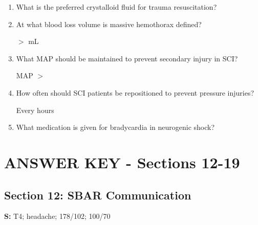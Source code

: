 \documentclass[11pt]{article}
\begin{document}
\begin{enumerate}
    \underline{\hspace{3cm}} gauge or larger, quantity: \underline{\hspace{2cm}}
    
    \vspace{0.3cm}
    
    \item What is the preferred crystalloid fluid for trauma resuscitation?
    
    \underline{\hspace{6cm}}
    
    \vspace{0.3cm}
    
    \item At what blood loss volume is massive hemothorax defined?
    
    $>$ \underline{\hspace{3cm}} mL
    
    \vspace{0.3cm}
    
    \item What MAP should be maintained to prevent secondary injury in SCI?
    
    MAP $>$ \underline{\hspace{3cm}}
    
    \vspace{0.3cm}
    
    \item How often should SCI patients be repositioned to prevent pressure injuries?
    
    Every \underline{\hspace{3cm}} hours
    
    \vspace{0.3cm}
    
    \item What medication is given for bradycardia in neurogenic shock?
    
    \underline{\hspace{6cm}}
    
\end{enumerate}

\newpage
\section*{ANSWER KEY - Sections 12-19}

\subsection*{Section 12: SBAR Communication}
\textbf{S:} T4; headache; 178/102; 100/70
\end{document}
